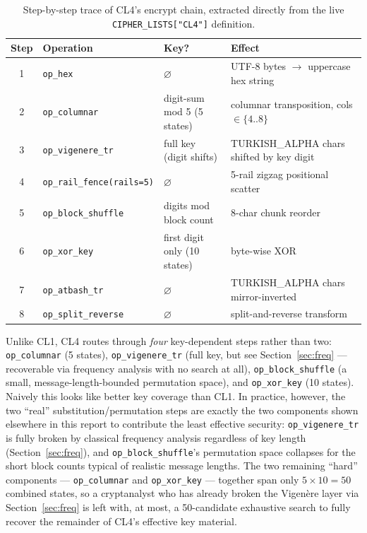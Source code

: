 \documentclass[11pt]{article}
\begin{document}
\begin{table}[h]
\centering
\small
\caption{Step-by-step trace of CL4's encrypt chain, extracted directly from the live \texttt{CIPHER\_LISTS["CL4"]} definition.}
\label{tab:cl4-trace}
\begin{tabular}{@{}clll@{}}
\toprule
\textbf{Step} & \textbf{Operation} & \textbf{Key?} & \textbf{Effect} \\
\midrule
1 & \texttt{op\_hex} & $\varnothing$ & UTF-8 bytes $\to$ uppercase hex string \\
2 & \texttt{op\_columnar} & digit-sum mod 5 (5 states) & columnar transposition, cols $\in \{4..8\}$ \\
3 & \texttt{op\_vigenere\_tr} & full key (digit shifts) & TURKISH\_ALPHA chars shifted by key digit \\
4 & \texttt{op\_rail\_fence(rails=5)} & $\varnothing$ & 5-rail zigzag positional scatter \\
5 & \texttt{op\_block\_shuffle} & digits mod block count & 8-char chunk reorder \\
6 & \texttt{op\_xor\_key} & first digit only (10 states) & byte-wise XOR \\
7 & \texttt{op\_atbash\_tr} & $\varnothing$ & TURKISH\_ALPHA chars mirror-inverted \\
8 & \texttt{op\_split\_reverse} & $\varnothing$ & split-and-reverse transform \\
\bottomrule
\end{tabular}
\end{table}

Unlike CL1, CL4 routes through \emph{four} key-dependent steps rather
than two: \texttt{op\_columnar} (5 states), \texttt{op\_vigenere\_tr}
(full key, but see Section~\ref{sec:freq} --- recoverable via frequency
analysis with no search at all), \texttt{op\_block\_shuffle} (a small,
message-length-bounded permutation space), and \texttt{op\_xor\_key}
(10 states). Naively this looks like better key coverage than CL1.
In practice, however, the two ``real'' substitution/permutation steps
are exactly the two components shown elsewhere in this report to
contribute the least effective security: \texttt{op\_vigenere\_tr} is
fully broken by classical frequency analysis regardless of key length
(Section~\ref{sec:freq}), and \texttt{op\_block\_shuffle}'s permutation
space collapses for the short block counts typical of realistic
message lengths. The two remaining ``hard'' components ---
\texttt{op\_columnar} and \texttt{op\_xor\_key} --- together span only
$5 \times 10 = 50$ combined states, so a cryptanalyst who has already
broken the Vigen\`ere layer via Section~\ref{sec:freq} is left with, at
most, a 50-candidate exhaustive search to fully recover the remainder
of CL4's effective key material.
\end{document}
